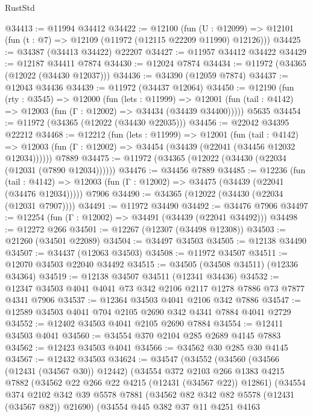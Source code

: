 \begin{lexlean}{RustStd}
\begin{coremodule}
@34413 := @11994 @34412
@34422 := @12100
    (fun (U : @12099) => @12101 (fun (t : @7) => @12109 (@11972 (@12115 @22209 @11990) @12126)))
@34425 := @34387 (@34413 @34422) @22207
@34427 := @11957 @34412 @34422
@34429 := @12187 @34411 @7874
@34430 := @12024 @7874
@34434 := @11972 (@34365 (@12022 (@34430 @12037)))
@34436 := @34390 (@12059 @7874)
@34437 := @12043 @34436
@34439 := @11972 (@34437 @12064)
@34450 := @12190
    (fun (rty : @3545) =>
    @12000
      (fun (lets : @11999) =>
      @12001 (fun (tail : @4142) => @12003 (fun (Γ : @12002) => @34434 (@34439 @34400)))))
    @5635
@34454 := @11972 (@34365 (@12022 (@34430 @22035)))
@34456 := @22042 @34395 @22212
@34468 := @12212
    (fun (lets : @11999) =>
    @12001
      (fun (tail : @4142) =>
      @12003 (fun (Γ : @12002) => @34454 (@34439 (@22041 (@34456 @12032 @12034))))))
    @7889
@34475 := @11972 (@34365 (@12022 (@34430 (@22034 (@12031 (@7890 @12034))))))
@34476 := @34456 @7889
@34485 := @12236
    (fun (tail : @4142) => @12003 (fun (Γ : @12002) => @34475 (@34439 (@22041 (@34476 @12034)))))
    @7906
@34490 := @34365 (@12022 (@34430 (@22034 (@12031 @7907))))
@34491 := @11972 @34490
@34492 := @34476 @7906
@34497 := @12254 (fun (Γ : @12002) => @34491 (@34439 (@22041 @34492)))
@34498 := @12272 @266
@34501 := @12267 (@12307 (@34498 @12308))
@34503 := @21260 (@34501 @22089)
@34504 := @34497 @34503
@34505 := @12138 @34490
@34507 := @34437 (@12063 @34503)
@34508 := @11972 @34507
@34511 := @12070 @34503 @22040 @34492
@34515 := @34505 (@34508 @34511) (@12336 @34364)
@34519 := @12138 @34507 @34511 (@12341 @34436)
@34532 := @12347 @34503 @4041 @4041 @73 @342 @2106 @2117 @1278 @7886 @73 @7877 @4341 @7906
@34537 := @12364 @34503 @4041 @2106 @342 @7886
@34547 := @12589 @34503 @4041 @704 @2105 @2690 @342 @4341 @7884 @4041 @2729
@34552 := @12402 @34503 @4041 @2105 @2690 @7884
@34554 := @12411 @34503 @4041
@34560 := @34554 @370 @2104 @285 @2689 @4145 @7883
@34562 := @12423 @34503 @4041
@34566 := @34562 @30 @285 @30 @4145
@34567 := @12432 @34503
@34624 := @34547
    (@34552
      (@34560
        (@34566 (@12431 (@34567 @30)) @12442)
        (@34554
          @372
          @2103
          @266
          @1383
          @4215
          @7882
          (@34562 @22 @266 @22 @4215 (@12431 (@34567 @22)) @12861)
          (@34554
            @374
            @2102
            @342
            @39
            @5578
            @7881
            (@34562 @82 @342 @82 @5578 (@12431 (@34567 @82)) @21690)
            (@34554
              @445
              @382
              @37
              @11
              @4251
              @4163

\end{coremodule}
\end{lexlean}
